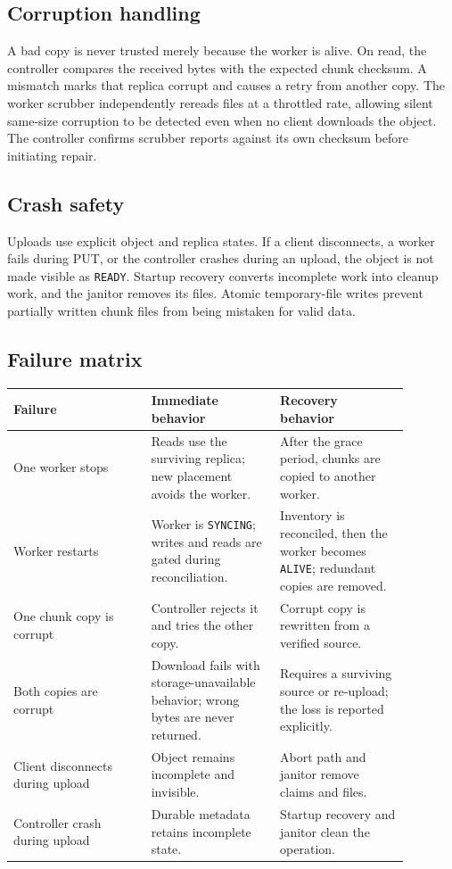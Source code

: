\documentclass[11pt,a4paper]{article}
\begin{document}
\subsection{Corruption handling}
A bad copy is never trusted merely because the worker is alive. On read, the controller compares the received bytes with the expected chunk checksum. A mismatch marks that replica corrupt and causes a retry from another copy. The worker scrubber independently rereads files at a throttled rate, allowing silent same-size corruption to be detected even when no client downloads the object. The controller confirms scrubber reports against its own checksum before initiating repair.

\subsection{Crash safety}
Uploads use explicit object and replica states. If a client disconnects, a worker fails during PUT, or the controller crashes during an upload, the object is not made visible as \texttt{READY}. Startup recovery converts incomplete work into cleanup work, and the janitor removes its files. Atomic temporary-file writes prevent partially written chunk files from being mistaken for valid data.

\subsection{Failure matrix}
\begin{longtable}{p{0.30\linewidth}p{0.29\linewidth}p{0.29\linewidth}}
\toprule
\textbf{Failure} & \textbf{Immediate behavior} & \textbf{Recovery behavior}\\
\midrule
One worker stops & Reads use the surviving replica; new placement avoids the worker. & After the grace period, chunks are copied to another worker.\\
Worker restarts & Worker is \texttt{SYNCING}; writes and reads are gated during reconciliation. & Inventory is reconciled, then the worker becomes \texttt{ALIVE}; redundant copies are removed.\\
One chunk copy is corrupt & Controller rejects it and tries the other copy. & Corrupt copy is rewritten from a verified source.\\
Both copies are corrupt & Download fails with storage-unavailable behavior; wrong bytes are never returned. & Requires a surviving source or re-upload; the loss is reported explicitly.\\
Client disconnects during upload & Object remains incomplete and invisible. & Abort path and janitor remove claims and files.\\
Controller crash during upload & Durable metadata retains incomplete state. & Startup recovery and janitor clean the operation.\\
\bottomrule
\end{longtable}
\end{document}
